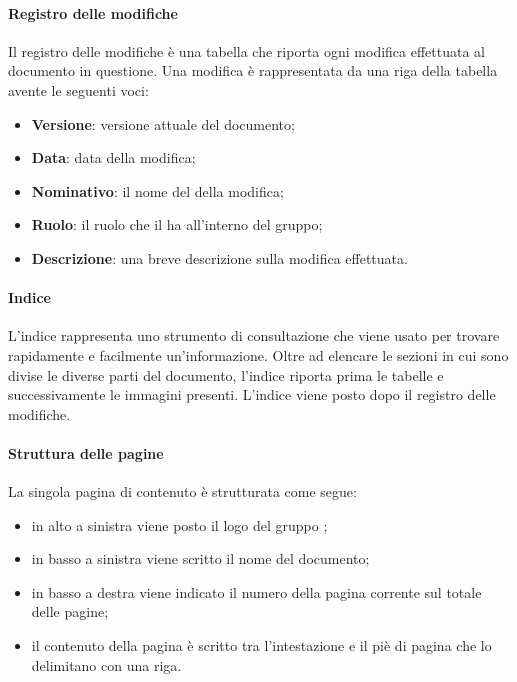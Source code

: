\paragraph{Registro delle modifiche}
Il registro delle modifiche è una tabella che riporta ogni modifica effettuata al documento in questione. Una modifica è rappresentata da una riga della tabella avente le seguenti voci:
\begin{itemize}

	\item \textbf{Versione}: versione attuale del documento;
	
	\item \textbf{Data}: data della modifica;
	
	\item \textbf{Nominativo}: il nome del  della modifica;
	
	\item \textbf{Ruolo}: il ruolo che il  ha all'interno del gruppo;

	\item \textbf{Descrizione}: una breve descrizione sulla modifica effettuata.
\end{itemize}

\paragraph{Indice}
L'indice rappresenta uno strumento di consultazione che viene usato per trovare rapidamente e facilmente un'informazione. Oltre ad elencare le sezioni in cui sono divise le diverse parti del documento, l'indice riporta prima le tabelle e successivamente le immagini presenti. L'indice viene posto dopo il registro delle modifiche.

\paragraph{Struttura delle pagine}
La singola pagina di contenuto è strutturata come segue:
\begin{itemize}

	\item in alto a sinistra viene posto il logo del gruppo \Gruppo{};
	
	\item in basso a sinistra viene scritto il nome del documento;
	
	\item in basso a destra viene indicato il numero della pagina corrente sul totale delle pagine;
	
	\item il contenuto della pagina è scritto tra l'intestazione e il piè di pagina che lo delimitano con una riga.
\end{itemize}

